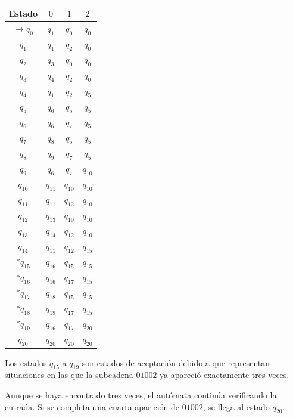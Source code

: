 \documentclass[12pt]{article}
\begin{document}
\begin{center}
\begin{tabular}{c|ccc}
Estado & $0$ & $1$ & $2$ \\ \hline

$\rightarrow q_0$ & $q_1$ & $q_0$ & $q_0$ \\
$q_1$ & $q_1$ & $q_2$ & $q_0$ \\
$q_2$ & $q_3$ & $q_0$ & $q_0$ \\
$q_3$ & $q_4$ & $q_2$ & $q_0$ \\
$q_4$ & $q_1$ & $q_2$ & $q_5$ \\ \hline

$q_5$ & $q_6$ & $q_5$ & $q_5$ \\
$q_6$ & $q_6$ & $q_7$ & $q_5$ \\
$q_7$ & $q_8$ & $q_5$ & $q_5$ \\
$q_8$ & $q_9$ & $q_7$ & $q_5$ \\
$q_9$ & $q_6$ & $q_7$ & $q_{10}$ \\ \hline

$q_{10}$ & $q_{11}$ & $q_{10}$ & $q_{10}$ \\
$q_{11}$ & $q_{11}$ & $q_{12}$ & $q_{10}$ \\
$q_{12}$ & $q_{13}$ & $q_{10}$ & $q_{10}$ \\
$q_{13}$ & $q_{14}$ & $q_{12}$ & $q_{10}$ \\
$q_{14}$ & $q_{11}$ & $q_{12}$ & $q_{15}$ \\ \hline

$*q_{15}$ & $q_{16}$ & $q_{15}$ & $q_{15}$ \\
$*q_{16}$ & $q_{16}$ & $q_{17}$ & $q_{15}$ \\
$*q_{17}$ & $q_{18}$ & $q_{15}$ & $q_{15}$ \\
$*q_{18}$ & $q_{19}$ & $q_{17}$ & $q_{15}$ \\
$*q_{19}$ & $q_{16}$ & $q_{17}$ & $q_{20}$ \\ \hline

$q_{20}$ & $q_{20}$ & $q_{20}$ & $q_{20}$

\end{tabular}
\end{center}

Los estados $q_{15}$ a $q_{19}$ son estados de aceptación debido a que
representan situaciones en las que la subcadena $01002$ ya apareció
exactamente tres veces.

Aunque se haya encontrado tres veces, el autómata continúa verificando
la entrada. Si se completa una cuarta aparición de $01002$, se llega
al estado $q_{20}$.
\end{document}
